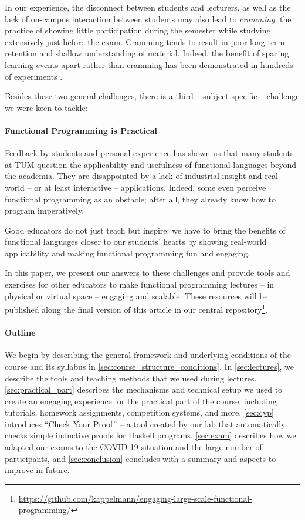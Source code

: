 In our experience, the disconnect between students and lecturers, as well as the lack of on-campus interaction between students may also lead to \emph{cramming}:
the practice of showing little participation during the semester
while studying extensively just before the exam.
Cramming tends to result in poor long-term retention and shallow understanding of material.
Indeed, the benefit of spacing learning events apart rather than cramming has been demonstrated in hundreds of experiments \cite{cramming1,cramming2}.

\vspace{\baselineskip}\noindent
Besides these two general challenges,
there is a third -- subject-specific --
challenge we were keen to tackle:

\paragraph{Functional Programming is Practical }
Feedback by students and personal experience has shown us that many students
at TUM question the applicability and usefulness
of functional languages beyond
the academia.
They are disappointed by a lack of industrial insight
and real world -- or at least interactive -- applications.
Indeed, some even perceive functional programming as an obstacle;
after all, they already know how to program imperatively.

Good educators do not just teach but inspire:
we have to bring the benefits of functional languages
closer to our students' hearts
by showing real-world applicability and making functional programming fun and engaging.


\vspace{\baselineskip}\noindent
In this paper,
we present our answers to these challenges
and provide tools and exercises for other educators
to make functional programming lectures -- in physical or virtual space -- engaging and scalable.
These resources will be published along the final
version of this article in our central repository\footnote{\url{https://github.com/kappelmann/engaging-large-scale-functional-programming/}}.

\paragraph{Outline}

We begin by describing the general framework and underlying conditions of the course and its syllabus in \cref{sec:course_structure_conditions}.
In \cref{sec:lectures},
we describe the tools and teaching methods that we used during lectures.
\cref{sec:practical_part} describes the
mechanisms and technical setup
we used to create an engaging experience
for the practical part of the course,
including tutorials, homework assignments,
competition systems, and more.
\cref{sec:cyp} introduces
``Check Your Proof'' -- a tool created
by our lab that automatically checks simple inductive proofs for Haskell programs.
\cref{sec:exam} describes how we adapted our exams to the COVID-19 situation and the large number of participants,
and \cref{sec:conclusion} concludes with a summary and aspects to improve in future.

